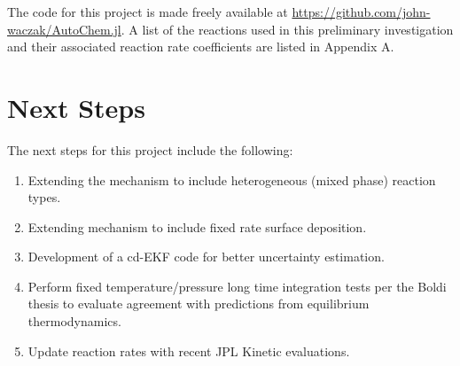 The code for this project is made freely available at \url{https://github.com/john-waczak/AutoChem.jl}. A list of the reactions used in this preliminary investigation and their associated reaction rate coefficients are listed in Appendix A.

\section{Next Steps}

The next steps for this project include the following:
\begin{enumerate}
\item Extending the mechanism to include heterogeneous (mixed phase) reaction types.
\item Extending mechanism to include fixed rate surface deposition.
\item Development of a cd-EKF code for better uncertainty estimation.
\item Perform fixed temperature/pressure long time integration tests per the Boldi thesis to evaluate agreement with predictions from equilibrium thermodynamics.
\item Update reaction rates with recent JPL Kinetic evaluations.
\end{enumerate}




